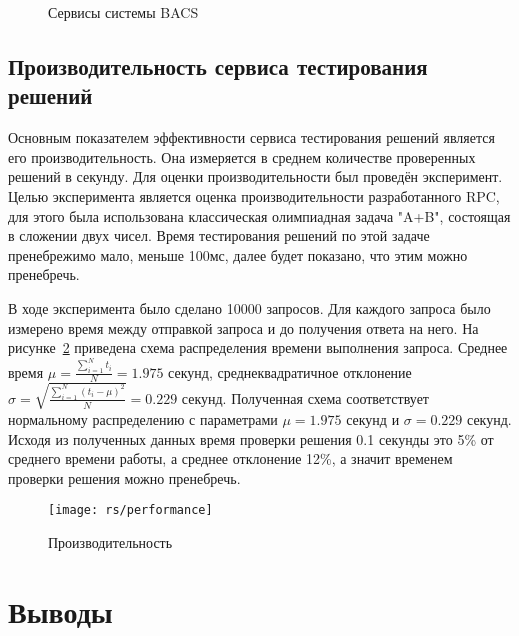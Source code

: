 \begin{figure}[H]
    \centering
    
    \caption{Сервисы системы BACS}
    \label{fig:bacsservice}
\end{figure}

\subsection{Производительность сервиса тестирования решений}
Основным показателем эффективности сервиса тестирования решений является
его производительность. Она измеряется в среднем количестве проверенных решений
в секунду. Для оценки производительности был проведён эксперимент.
Целью эксперимента является оценка производительности разработанного RPC,
для этого была использована классическая олимпиадная задача "A+B", состоящая
в сложении двух чисел. Время тестирования решений по этой задаче пренебрежимо
мало, меньше 100мс, далее будет показано, что этим можно пренебречь.

В ходе эксперимента было сделано 10000 запросов. Для каждого запроса
было измерено время между отправкой запроса и до получения ответа на него.
На рисунке~\ref{fig:performance} приведена схема распределения времени
выполнения запроса. Среднее время $\mu = \frac{\sum_{i=1}^N t_i}{N} = 1.975$
секунд, среднеквадратичное отклонение $\sigma =
\sqrt{\frac{\sum_{i=1}^N \left(t_i - \mu\right)^2}{N}} = 0.229$ секунд.
Полученная схема соответствует нормальному распределению с параметрами
$\mu = 1.975$ секунд и $\sigma = 0.229$ секунд. Исходя из полученных данных
время проверки решения 0.1 секунды это 5\% от среднего времени работы,
а среднее отклонение 12\%, а значит временем проверки решения можно пренебречь.

\begin{figure}[H]
    \centering
    \texttt{[image: rs/performance]}
    \caption{Производительность}
    \label{fig:performance}
\end{figure}

\section{Выводы}

